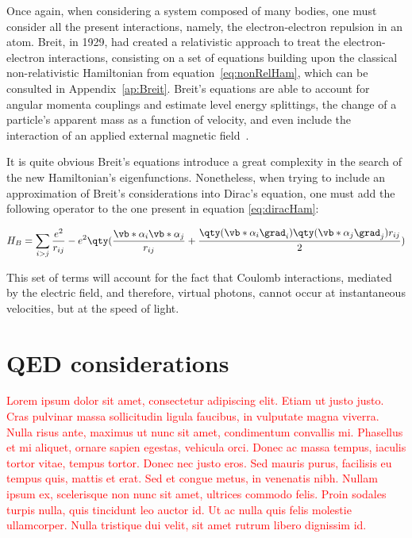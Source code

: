 Once again, when considering a system composed of many bodies, one must consider all the present interactions, namely, the electron-electron repulsion in an atom.
 Breit, in 1929, had created a relativistic approach to treat the electron-electron interactions, consisting on a set of equations building upon the classical non-relativistic Hamiltonian from equation~\eqref{eq:nonRelHam}, which can be consulted in Appendix~\ref{ap:Breit}.
  Breit's equations are able to account for angular momenta couplings and estimate level energy splittings, the change of a particle's apparent mass as a function of velocity, and even include the interaction of an applied external magnetic field~\cite{Bethe1977}.

  It is quite obvious Breit's equations introduce a great complexity in the search of the new Hamiltonian's eigenfunctions. Nonetheless, when trying to include an approximation of Breit's considerations into Dirac's equation, one must add the following operator to the one present in equation \eqref{eq:diracHam}:

  \begin{equation}
    H_B = \sum_{i>j}\frac{e^2}{r_{ij}} - e^2\qty(\frac{\vb*{\alpha}_i\vb*{\alpha}_j}{r_{ij}}+\frac{\qty(\vb*{\alpha}_i \grad_i)\qty(\vb*{\alpha}_j \grad_j)r_{ij}}{2})  
    \label{eq:BreitHam}
  \end{equation}

This set of terms will account for the fact that Coulomb interactions, mediated by the electric field, and therefore, \gls{virtual photons}, cannot occur at instantaneous velocities, but at the speed of light.


\section{\gls{QED} considerations}


\textcolor{red}{Lorem ipsum dolor sit amet, consectetur adipiscing elit. Etiam ut justo justo. Cras pulvinar massa sollicitudin ligula faucibus, in vulputate magna viverra. Nulla risus ante, maximus ut nunc sit amet, condimentum convallis mi. Phasellus et mi aliquet, ornare sapien egestas, vehicula orci. Donec ac massa tempus, iaculis tortor vitae, tempus tortor. Donec nec justo eros. Sed mauris purus, facilisis eu tempus quis, mattis et erat. Sed et congue metus, in venenatis nibh. Nullam ipsum ex, scelerisque non nunc sit amet, ultrices commodo felis. Proin sodales turpis nulla, quis tincidunt leo auctor id. Ut ac nulla quis felis molestie ullamcorper. Nulla tristique dui velit, sit amet rutrum libero dignissim id.}

